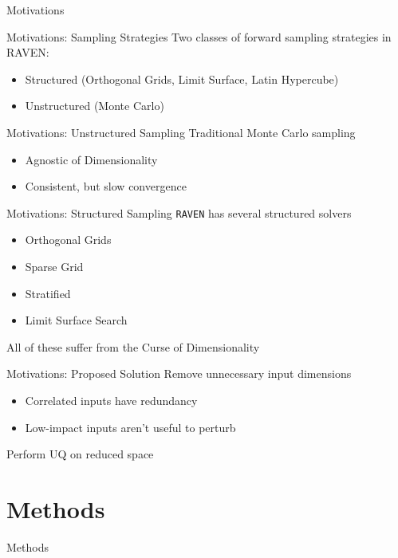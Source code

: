 \documentclass[t,9pt,svgnames]{beamer}
\newcommand{\code}[1]{\texttt{#1}}
\begin{document}
\begin{frame}{Motivations}
\end{frame}

\begin{frame}{Motivations: Sampling Strategies}
  Two classes of forward sampling strategies in RAVEN:
  \begin{itemize}
    \item Structured (Orthogonal Grids, Limit Surface, Latin Hypercube)
    \item Unstructured (Monte Carlo)
  \end{itemize}
\end{frame}

\begin{frame}{Motivations: Unstructured Sampling}
  Traditional Monte Carlo sampling
  \begin{itemize}
    \item Agnostic of Dimensionality
    \item Consistent, but slow convergence
  \end{itemize}
\end{frame}

\begin{frame}{Motivations: Structured Sampling}
  \code{RAVEN} has several structured solvers
  \begin{itemize}
    \item Orthogonal Grids
    \item Sparse Grid
    \item Stratified
    \item Limit Surface Search
  \end{itemize}
  All of these suffer from the Curse of Dimensionality
\end{frame}

\begin{frame}{Motivations: Proposed Solution}
  Remove unnecessary input dimensions
  \begin{itemize}
    \item Correlated inputs have redundancy
    \item Low-impact inputs aren't useful to perturb
  \end{itemize}
  Perform UQ on reduced space
\end{frame}
\section{Methods}
\begin{frame}{Methods}
\end{frame}
\end{document}

